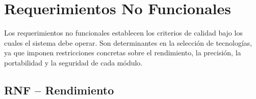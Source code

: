\section{Requerimientos No Funcionales}

Los requerimientos no funcionales establecen los criterios de calidad bajo los cuales el
sistema debe operar. Son determinantes en la selección de tecnologías, ya que imponen
restricciones concretas sobre el rendimiento, la precisión, la portabilidad y la seguridad
de cada módulo.

\subsection*{RNF -- Rendimiento}

